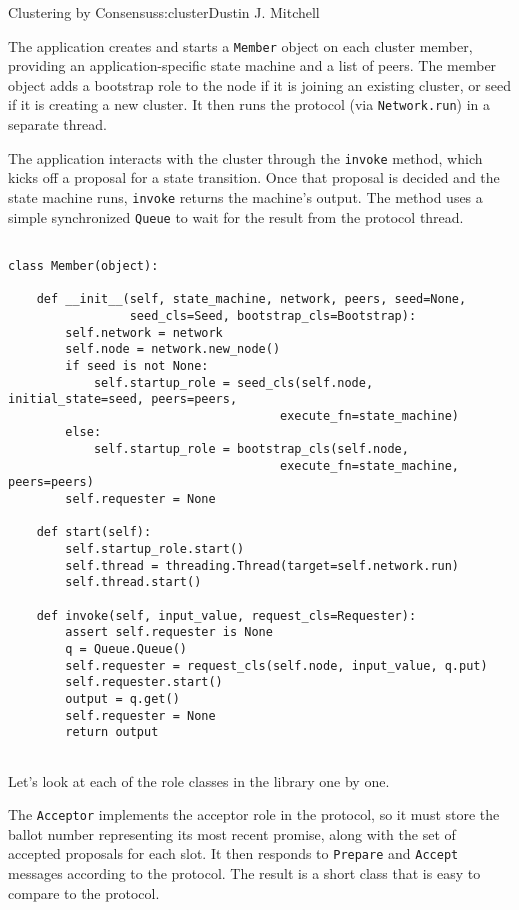 \begin{aosachapter}{Clustering by Consensus}{s:cluster}{Dustin J. Mitchell}
\label{application-interface}

The application creates and starts a \texttt{Member} object on each
cluster member, providing an application-specific state machine and a
list of peers. The member object adds a bootstrap role to the node if it
is joining an existing cluster, or seed if it is creating a new cluster.
It then runs the protocol (via \texttt{Network.run}) in a separate
thread.

The application interacts with the cluster through the \texttt{invoke}
method, which kicks off a proposal for a state transition. Once that
proposal is decided and the state machine runs, \texttt{invoke} returns
the machine's output. The method uses a simple synchronized
\texttt{Queue} to wait for the result from the protocol thread.

\begin{verbatim}

class Member(object):

    def __init__(self, state_machine, network, peers, seed=None,
                 seed_cls=Seed, bootstrap_cls=Bootstrap):
        self.network = network
        self.node = network.new_node()
        if seed is not None:
            self.startup_role = seed_cls(self.node, initial_state=seed, peers=peers,
                                      execute_fn=state_machine)
        else:
            self.startup_role = bootstrap_cls(self.node,
                                      execute_fn=state_machine, peers=peers)
        self.requester = None

    def start(self):
        self.startup_role.start()
        self.thread = threading.Thread(target=self.network.run)
        self.thread.start()

    def invoke(self, input_value, request_cls=Requester):
        assert self.requester is None
        q = Queue.Queue()
        self.requester = request_cls(self.node, input_value, q.put)
        self.requester.start()
        output = q.get()
        self.requester = None
        return output
    
\end{verbatim}

\label{role-classes}

Let's look at each of the role classes in the library one by one.

\label{acceptor}

The \texttt{Acceptor} implements the acceptor role in the protocol, so
it must store the ballot number representing its most recent promise,
along with the set of accepted proposals for each slot. It then responds
to \texttt{Prepare} and \texttt{Accept} messages according to the
protocol. The result is a short class that is easy to compare to the
protocol.


\end{aosachapter}
